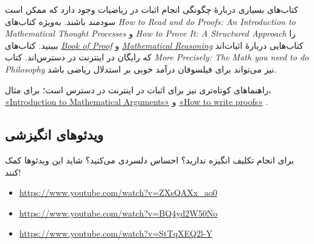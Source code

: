 \documentclass[../../../include/open-logic-section]{subfiles}
\begin{document}


کتاب‌های بسیاری دربارهٔ چگونگی انجام اثبات در ریاضیات وجود دارد که
ممکن است سودمند باشند. به‌ویژه کتاب‌های
\emph{How to Read and do Proofs: An Introduction to Mathematical
Thought Processes} \citep{Solow2013} و
\emph{How to Prove It: A Structured Approach} \citep{Velleman2019}
را ببینید. کتاب‌های
\href{http://www.people.vcu.edu/~rhammack/BookOfProof/BookOfProof.pdf}{\emph{Book
of Proof}} \citep{Hammack2013} و
\href{https://scholarworks.gvsu.edu/books/7/}{\emph{Mathematical
Reasoning}} \citep{Sandstrum2019} کتاب‌هایی دربارهٔ اثبات‌اند که
رایگان در اینترنت در دسترس‌اند. کتاب
\emph{More Precisely: The Math you need to do Philosophy}
\citep{Steinhart2018} نیز می‌تواند برای فیلسوفان درآمد خوبی بر استدلال
ریاضی باشد.

راهنماهای کوتاه‌تری نیز برای اثبات در اینترنت در دسترس است؛ برای مثال،
\href{https://math.berkeley.edu/~hutching/teach/proofs.pdf}{«Introduction
  to Mathematical Arguments»} \citep{Hutchings2003} و
\href{https://eugeniacheng.com/wp-content/uploads/2017/02/cheng-proofguide.pdf}{«How to
  write proofs»} \citep{Cheng2004}.

\subsection{ویدئوهای انگیزشی}

برای انجام تکلیف انگیزه ندارید؟ احساس دلسردی می‌کنید؟ شاید این ویدئوها
کمک کنند!

\begin{itemize}
\item \url{https://www.youtube.com/watch?v=ZXsQAXx_ao0}
\item \url{https://www.youtube.com/watch?v=BQ4yd2W50No}
\item \url{https://www.youtube.com/watch?v=StTqXEQ2l-Y}
\end{itemize}
\end{document}
